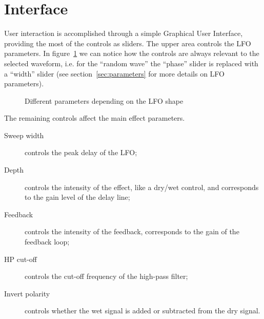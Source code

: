 \section{Interface}\label{sec:gui}
\label{sec:gui}

User interaction is accomplished through a simple Graphical User Interface, providing the most of the controls as sliders.
The upper area controls the LFO parameters. In figure~\ref{fig:gui-lfo} we can notice how the controls are always relevant to the selected waveform, i.e. for the ``random wave'' the ``phase'' slider is replaced with a ``width'' slider (see section~\ref{sec:parameters} for more details on LFO parameters).

\begin{figure}[H]
	\centering
	\caption{Different parameters depending on the LFO shape}
	\label{fig:gui-lfo}
\end{figure}

The remaining controls affect the main effect parameters.

\begin{description}
	\item[Sweep width] controls the peak delay of the LFO;
	\item[Depth] controls the intensity of the effect, like a dry/wet control, and corresponds to the gain level of the delay line;
	\item[Feedback] controls the intensity of the feedback, corresponds to the gain of the feedback loop;
	\item[HP cut-off] controls the cut-off frequency of the high-pass filter;
	\item[Invert polarity] controls whether the wet signal is added or subtracted from the dry signal.
\end{description}

